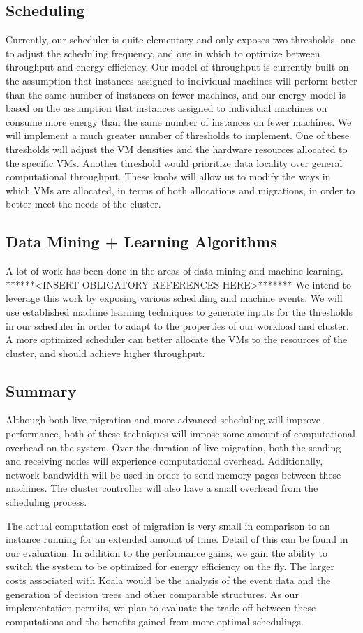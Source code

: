 \subsection{Scheduling}

Currently, our scheduler is quite elementary and only exposes two thresholds, one to adjust the scheduling frequency, and one in which to optimize between throughput and energy efficiency.  Our model of throughput is currently built on the assumption that instances assigned to individual machines will perform better than the same number of instances on fewer machines, and our energy model is based on the assumption that instances assigned to individual machines on consume more energy than the same number of instances on fewer machines.  We will implement a much greater number of thresholds to implement.  One of these thresholds will adjust the VM densities and the hardware resources allocated to the specific VMs.  Another threshold would prioritize data locality over general computational throughput.  These knobs will allow us to modify the ways in which VMs are allocated, in terms of both allocations and migrations, in order to better meet the needs of the cluster.

\subsection{Data Mining + Learning Algorithms}

A lot of work has been done in the areas of data mining and machine learning. ******<INSERT OBLIGATORY REFERENCES HERE>*******  We intend to leverage this work by exposing various scheduling and machine events.  We will use established machine learning techniques to generate inputs for the thresholds in our scheduler in order to adapt to the properties of our workload and cluster.  A more optimized scheduler can better allocate the VMs to the resources of the cluster, and should achieve higher throughput.

\subsection{Summary}

Although both live migration and more advanced scheduling will improve performance, both of these techniques will impose some amount of computational overhead on the system.  Over the duration of live migration, both the sending and receiving nodes will experience computational overhead.  Additionally, network bandwidth will be used in order to send memory pages between these machines.  The cluster controller will also have a small overhead from the scheduling process.  

The actual computation cost of migration is very small in comparison to an instance running for an extended amount of time.  Detail of this can be found in our evaluation.  In addition to the performance gains, we gain the ability to switch the system to be optimized for energy efficiency on the fly.  The larger costs associated with Koala would be the analysis of the event data and the generation of decision trees and other comparable structures.  As our implementation permits, we plan to evaluate the trade-off between these computations and the benefits gained from more optimal schedulings. 